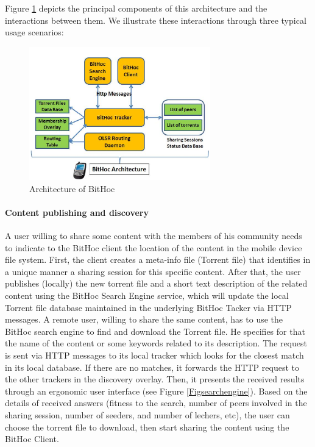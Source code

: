 Figure \ref{figarch} depicts the principal components of this architecture and the interactions between them. We illustrate these interactions through three typical usage scenarios:

\begin{figure}[!h]
  \begin{center}
    \includegraphics[width=0.7\textwidth]{Chapitre2/architecture.png}
  \end{center}
  \caption{Architecture of BitHoc}
  \label{figarch}
\end{figure}

\paragraph{Content publishing and discovery}

A user willing to share some content with the members of his community needs to indicate to the BitHoc client the location of the content in the mobile device file system. First, the client creates a meta-info file (Torrent file) that identifies in a unique manner a sharing session for this specific content. After that, the user publishes (locally) the new torrent file and a short text description of the related content using the BitHoc Search Engine service, which will update the local Torrent file database maintained in the underlying BitHoc Tacker via HTTP messages. A remote user, willing to share the same content, has to use the BitHoc search engine to find and download the Torrent file. He specifies for that the name of the content or some keywords related to its description. The request is sent via HTTP messages to its local tracker which looks for the closest match in its local database. If there are no matches, it forwards the HTTP request to the other trackers in the discovery overlay. Then, it presents the received results through an ergonomic user interface (see Figure \ref{Figsearchengine}). Based on the details of received answers (fitness to the search, number of peers involved in the sharing session, number of seeders, and number of lechers, etc), the user can choose the torrent file to download, then start sharing the content using the BitHoc Client.

